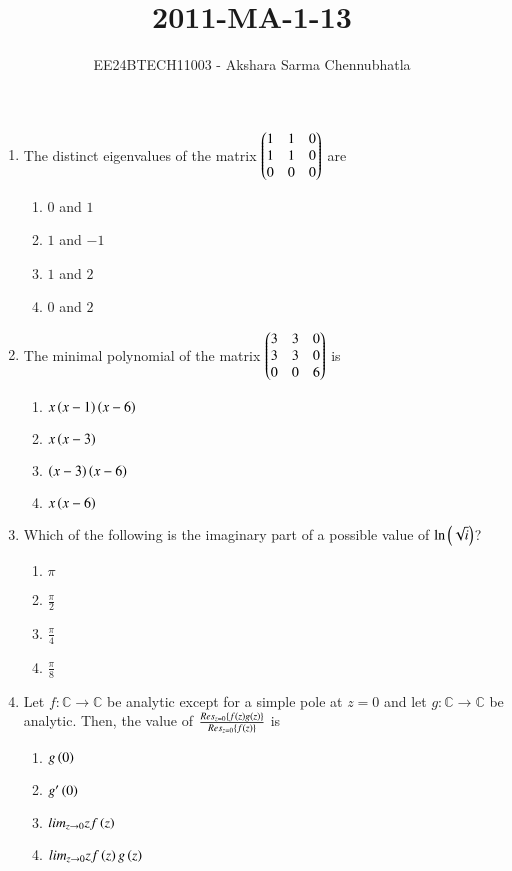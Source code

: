 \documentclass[journal,12pt,onecolumn]{IEEEtran}
\theoremstyle{remark}
\begin{document}

\title{2011-MA-1-13}
\author{EE24BTECH11003 - Akshara Sarma Chennubhatla%
}
\maketitle
\begin{enumerate}

\item The distinct eigenvalues of the matrix
$\begin{pmatrix}1 & 1 & 0\\1 & 1 & 0\\0 & 0 & 0\end{pmatrix}$ are
\hfill{}
\begin{enumerate}
\item $0$ and $1$
\item $1$ and $-1$
\item $1$ and $2$
\item $0$ and $2$
\end{enumerate}

\item The minimal polynomial of the matrix
$\begin{pmatrix}3 & 3 & 0\\3 & 3 & 0\\0 & 0 & 6\end{pmatrix}$ is
\hfill{}
\begin{enumerate}
\item $x\left(x-1\right)\left(x-6\right)$
\item $x\left(x-3\right)$
\item $\left(x-3\right)\left(x-6\right)$
\item $x\left(x-6\right)$
\end{enumerate}

\item Which of the following is the imaginary part of a possible value of $\ln \left(\sqrt{i}\right)$?
\hfill{}
\begin{enumerate}
\item $\pi$
\item $\frac{\pi}{2}$
\item $\frac{\pi}{4}$
\item $\frac{\pi}{8}$
\end{enumerate}

\item Let $f\colon \mathbb{C} \to \mathbb{C}$ be analytic except for a simple pole at $z=0$ and let $g\colon \mathbb{C} \to \mathbb{C}$ be analytic. Then, the value of $\frac{Res_{z=0}\left\{f\left(z\right)g\left(z\right)\right\}}{Res_{z=0}\left\{f\left(z\right)\right\}}$ is
\hfill{}
\begin{enumerate}
\item $g\left(0\right)$
\item $g'\left(0\right)$
\item $lim_{z \to 0} zf\left(z\right)$
\item $lim_{z \to 0} zf\left(z\right)g\left(z\right)$
\end{enumerate}


\end{enumerate}
\end{document}
